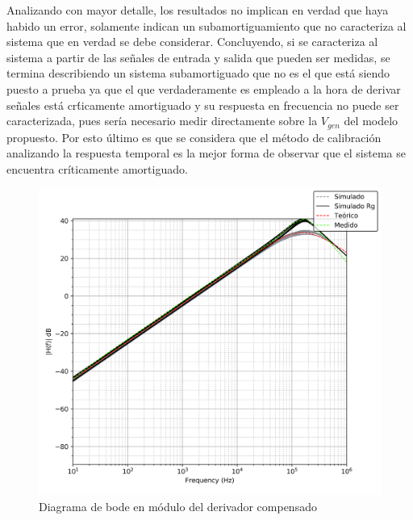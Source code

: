 Analizando con mayor detalle, los resultados no implican en verdad que haya habido un error, solamente indican
un subamortiguamiento que no caracteriza al sistema que en verdad se debe considerar. Concluyendo, si se caracteriza al sistema a partir de las se\~nales de entrada
y salida que pueden ser medidas, se termina describiendo un sistema subamortiguado que no es el que est\'a siendo puesto a prueba ya que el que verdaderamente es empleado a la hora de derivar se\~nales est\'a cr\'ticamente
amortiguado y su respuesta en frecuencia no puede ser caracterizada, pues ser\'ia necesario medir directamente sobre la $V_{gen}$ del modelo propuesto. Por esto \'ultimo es que se considera que el
m\'etodo de calibraci\'on analizando la respuesta temporal es la mejor forma de observar que el sistema se encuentra cr\'iticamente amortiguado.

\begin{figure}[H]
	\centering
	\includegraphics[scale=0.6]{../EJ4/Recursos/Derivador_compensado/bode_modulo.png}
	\caption{Diagrama de bode en m\'odulo del derivador compensado}
	\label{fig:derivador_compensado_bode_modulo}
\end{figure}

